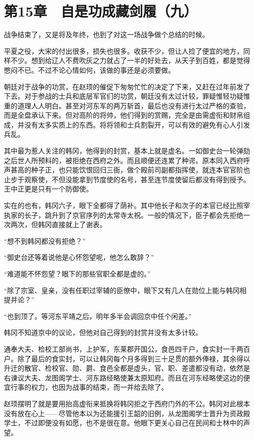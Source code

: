 \section{第15章　自是功成藏剑履（九）}

战争结束了，又是将及年终，也到了对这一场战争做个总结的时候。

平夏之役，大宋的付出很多，损失也很多。收获不少，但让人捡了便宜的地方，同样不少。想到给辽人不费吹灰之力就占了一半的好处去，从天子到百姓，都是觉得憋闷不已。不过不论心情如何，该做的事还是必须要做。

朝廷对于战争的功赏，在赵顼的催促下匆匆忙忙的决定了下来，又赶在过年前发了下去。对于参战的士兵和底层军官们的功赏，朝廷没有太过计较，罪疑惟轻功疑惟重的道理人人明白。甚至对河东军的两万斩首，最后也没有进行太过严格的查验，而是全盘承认下来。但对高阶的将帅，他们得到的赏赐，完全是由需虚衔和财帛组成，并没有太多实质上的东西。将将领和士兵割裂开，可以有效的避免有心人引发兵乱。

其中最为惹人关注的韩冈，他得到的封赏，基本上就是虚名。一如御史台一轮弹劾之后世人所预料的，被拒绝在西府之外。而且顺便还连累了种谔。原本同入西府呼声甚高的种子正，也只能饮恨回归三衙，做个殿前司副都指挥使，就连本官官阶也止步于观察使，不但没能拿到节度使的名号，甚至连节度使留后都没有得到授予。王中正更是只有一个防御使。

实在的也有，韩冈六子，眼下全都得了荫补。其中他长子和次子的本官已经比照宰执家的长子，跳升到了京官序列的太常寺太祝。一般的情况下，臣子都会先拒绝一次两次，但韩冈直接就上了谢表。

“想不到韩冈都没有拒绝？”

“御史台还等着说他是心怀怨望呢，他怎么敢辞？”

“难道能不怀怨望？眼下的那些官职全都是虚的。”

“除了宗室、皇亲，没有任职过宰辅的臣僚中，眼下又有几人在勋位上能与韩冈相提并论？”

“也到顶了。等河东平靖之后，明年多半会调回京中任个闲差。”

韩冈不知道京中的议论，但他对自己得到的封赏并没有太多计较。

通奉大夫、检校工部尚书，上护军，东莱郡开国公，食邑四千户，食实封一千两百户。除了最后的食实封，可以让韩冈每个月多得到三十足贯的额外俸禄，其余得以升迁的散官、检校官、勋、爵、食邑全都是虚头，官、职、差遣都没有动，依然是右谏议大夫、龙图阁学士、河东路经略使兼太原知府。而且在河东经略使这边的便宜行事的权力，也因为战事的结束，而一并给去除了。

赵顼摆明了就是要用抬高虚衔来抵换将韩冈拒之于西府门外的不公。韩冈对此根本没有放在心上——尽管他本以为还能援引王韶的旧例，从龙图阁学士晋升为资政殿学士，不过即便没有如愿，也不是很在意。他眼下更关心自己在民间和士林中的声望。

